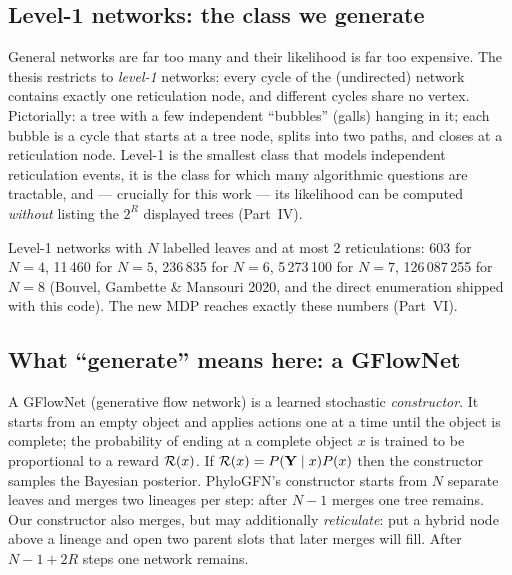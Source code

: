 \subsection{Level-1 networks: the class we generate}
General networks are far too many and their likelihood is far too expensive. The thesis restricts to \emph{level-1} networks: every cycle of the (undirected) network contains exactly one reticulation node, and different cycles share no vertex. Pictorially: a tree with a few independent ``bubbles'' (galls) hanging in it; each bubble is a cycle that starts at a tree node, splits into two paths, and closes at a reticulation node. Level-1 is the smallest class that models independent reticulation events, it is the class for which many algorithmic questions are tractable, and --- crucially for this work --- its likelihood can be computed \emph{without} listing the $2^R$ displayed trees (Part~IV).

\begin{keybox}
Level-1 networks with $N$ labelled leaves and at most 2 reticulations: 603 for $N=4$, 11\,460 for $N=5$, 236\,835 for $N=6$, 5\,273\,100 for $N=7$, 126\,087\,255 for $N=8$ (Bouvel, Gambette \& Mansouri 2020, and the direct enumeration shipped with this code). The new MDP reaches exactly these numbers (Part~VI).
\end{keybox}

\subsection{What ``generate'' means here: a GFlowNet}
A GFlowNet (generative flow network) is a learned stochastic \emph{constructor}. It starts from an empty object and applies actions one at a time until the object is complete; the probability of ending at a complete object $x$ is trained to be proportional to a reward $\mathcal{R}(x)$. If $\mathcal{R}(x) = P(\mathbf{Y}\mid x)P(x)$ then the constructor samples the Bayesian posterior. PhyloGFN's constructor starts from $N$ separate leaves and merges two lineages per step: after $N-1$ merges one tree remains. Our constructor also merges, but may additionally \emph{reticulate}: put a hybrid node above a lineage and open two parent slots that later merges will fill. After $N-1+2R$ steps one network remains.
\clearpage
